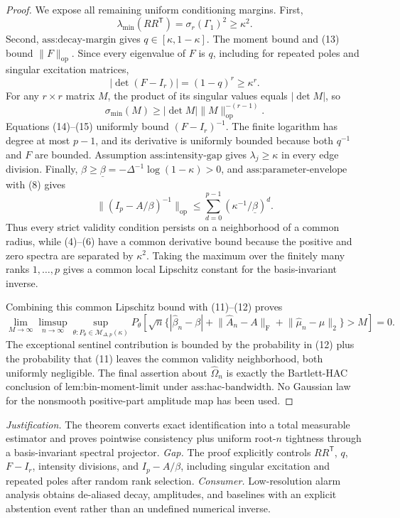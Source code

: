 \documentclass{article}
\begin{document}
\begin{proof}
We expose all remaining uniform conditioning margins.  First,
\[
 \lambda_{\min}(RR^{\mathsf T})=\sigma_r(\Gamma_1)^2\geq\kappa^2.
\tag{13}
\]
Second, \(\text{ass:decay-margin}\) gives \(q\in[\kappa,1-\kappa]\).  The moment bound and (13) bound \(\lVert F\rVert_{\mathrm{op}}\).  Since every eigenvalue of \(F\) is \(q\), including for repeated poles and singular excitation matrices,
\[
 |\det(F-I_r)|=(1-q)^r\geq\kappa^r.
\tag{14}
\]
For any \(r\times r\) matrix \(M\), the product of its singular values equals \(|\det M|\), so
\[
 \sigma_{\min}(M)\geq |\det M|\lVert M\rVert_{\mathrm{op}}^{-(r-1)}.
\tag{15}
\]
Equations (14)--(15) uniformly bound \((F-I_r)^{-1}\).  The finite logarithm has degree at most \(p-1\), and its derivative is uniformly bounded because both \(q^{-1}\) and \(F\) are bounded.  Assumption \(\text{ass:intensity-gap}\) gives \(\lambda_j\geq\kappa\) in every edge division.  Finally, \(\beta\geq\underline\beta=-\Delta^{-1}\log(1-\kappa)>0\), and \(\text{ass:parameter-envelope}\) with (8) gives
\[
 \lVert(I_p-A/\beta)^{-1}\rVert_{\mathrm{op}}
 \leq\sum_{d=0}^{p-1}(\kappa^{-1}/\underline\beta)^d.
\tag{16}
\]
Thus every strict validity condition persists on a neighborhood of a common radius, while (4)--(6) have a common derivative bound because the positive and zero spectra are separated by \(\kappa^2\).  Taking the maximum over the finitely many ranks \(1,\ldots,p\) gives a common local Lipschitz constant for the basis-invariant inverse.

Combining this common Lipschitz bound with (11)--(12) proves
\[
 \lim_{M\to\infty}\limsup_{n\to\infty}
 \sup_{\theta:P_\theta\in\mathcal M_{\Delta,p}(\kappa)}
 P_\theta\!\left[
 \sqrt n\{ |\widehat\beta_n-\beta|+
 \lVert\widehat A_n-A\rVert_{\mathrm F}+
 \lVert\widehat\mu_n-\mu\rVert_2\}>M\right]=0.
\tag{17}
\]
The exceptional sentinel contribution is bounded by the probability in (12) plus the probability that (11) leaves the common validity neighborhood, both uniformly negligible.  The final assertion about \(\widehat\Omega_n\) is exactly the Bartlett-HAC conclusion of \(\text{lem:bin-moment-limit}\) under \(\text{ass:hac-bandwidth}\).  No Gaussian law for the nonsmooth positive-part amplitude map has been used.
\end{proof}
\par\smallskip\noindent \textit{Justification.} The theorem converts exact identification into a total measurable estimator and proves pointwise consistency plus uniform root-\(n\) tightness through a basis-invariant spectral projector. \textit{Gap.} The proof explicitly controls \(RR^{\mathsf T}\), \(q\), \(F-I_r\), intensity divisions, and \(I_p-A/\beta\), including singular excitation and repeated poles after random rank selection. \textit{Consumer.} Low-resolution alarm analysis obtains de-aliased decay, amplitudes, and baselines with an explicit abstention event rather than an undefined numerical inverse.
\end{document}
